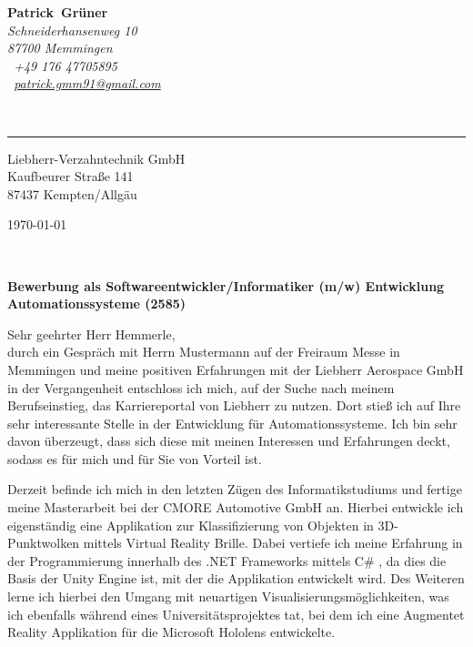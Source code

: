 \documentclass[10pt,a4paper]{article}
\def\firstname{Patrick}
\def\familyname{Grüner}
\begin{document}
\sffamily   %
\hfill%
\begin{minipage}[t]{.6\textwidth}
	\raggedleft%
	{\bfseries {\color{firstnamecolor}\firstname}~{\color{familynamecolor}\familyname}}\\[.35ex]
	\small\itshape%
	Schneiderhansenweg 10\\
	87700 Memmingen\\[.35ex]
	\Mobilefone~+49 176 47705895\\
	\Letter~\href{mailto:patrick.gmm91@gmail.com}{patrick.gmm91@gmail.com}
\end{minipage}\\[0.5em]
%
{\color{firstnamecolor}\rule{\textwidth}{.25ex}}
%
\begin{minipage}[t]{.4\textwidth}
	\raggedright%
	\vspace*{1em}
	Liebherr-Verzahntechnik GmbH \\[.35ex]
	\small%
	Kaufbeurer Straße 141\\
	87437 Kempten/Allgäu
\end{minipage}
%
\hfill
%
\begin{minipage}[t]{.4\textwidth}
	\raggedleft %
	\today
\end{minipage}\\[1em]
\raggedright

{\bfseries \color{familynamecolor}Bewerbung als Softwareentwickler/Informatiker (m/w) Entwicklung Automationssysteme (2585)\\[1.5em]}

Sehr geehrter Herr Hemmerle,\\[1em]
%
durch ein Gespräch mit Herrn {\color{red}Mustermann} auf der Freiraum Messe in Memmingen und meine positiven Erfahrungen mit der Liebherr Aerospace GmbH in der Vergangenheit entschloss ich mich, auf der Suche nach meinem Berufseinstieg, das Karriereportal von Liebherr zu nutzen. Dort stieß ich auf Ihre sehr interessante Stelle in der Entwicklung für Automationssysteme. {\color{red}Ich bin sehr davon überzeugt, dass sich diese mit meinen Interessen und Erfahrungen deckt, sodass es für mich und für Sie von Vorteil ist}.      

Derzeit befinde ich mich in den letzten Zügen des Informatikstudiums und fertige meine Masterarbeit bei der CMORE Automotive GmbH an. Hierbei entwickle ich eigenständig eine Applikation zur Klassifizierung von Objekten in 3D-Punktwolken mittels Virtual Reality Brille. Dabei vertiefe ich meine Erfahrung in der Programmierung innerhalb des .NET Frameworks mittels C\# , da dies die Basis der Unity Engine ist, mit der die Applikation entwickelt wird. Des Weiteren lerne ich hierbei den Umgang mit neuartigen Visualisierungsmöglichkeiten, was ich ebenfalls während eines Universitätsprojektes tat, bei dem ich eine Augmentet Reality Applikation für die Microsoft Hololens entwickelte.
\end{document}
